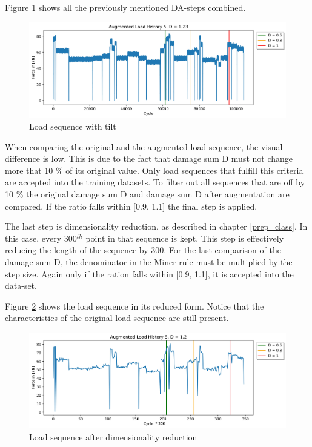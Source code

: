 Figure \ref{fig:Verlauf_5_tilt} shows all the previously mentioned DA-steps combined.

\begin{figure}[H]
	\centering
	\includegraphics[width=1\linewidth]{IMGs/Verlauf_5_tilt.jpg}
	\caption{Load sequence with tilt}
	\label{fig:Verlauf_5_tilt}
\end{figure}

When comparing the original and the augmented load sequence, the visual difference is low. This is due to the fact that damage sum D must not change more that 10 \% of its original value. Only load sequences that fulfill this criteria are accepted into the training datasets.
To filter out all sequences that are off by 10 \% the original damage sum D and damage sum D after augmentation are compared.
If the ratio falls within [0.9, 1.1] the final step is applied.


The last step is dimensionality reduction, as described in chapter \ref{prep_class}. In this case, every 300\(^{th}\) point in that sequence is kept. This step is effectively reducing the length of the sequence by 300. For the last comparison of the damage sum D, the denominator in the Miner rule must be multiplied by the step size. Again only if the ration falls within [0.9, 1.1], it is accepted into the data-set. 

Figure \ref{fig:Verlauf_5_reduced} shows the load sequence in its reduced form. Notice that the characteristics of the original load sequence are still present.
 
\begin{figure}[H]
	\centering
	\includegraphics[width=1\linewidth]{IMGs/Verlauf_5_reduced.png}
	\caption{Load sequence after dimensionality reduction}
	\label{fig:Verlauf_5_reduced}
\end{figure}

